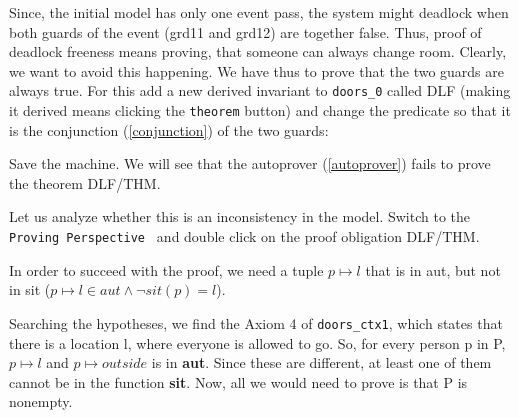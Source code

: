 Since, the initial model has only one event \textsf{pass}, the system might deadlock when both guards of the event (\textsf{grd11} and \textsf{grd12}) are together false. Thus, proof of deadlock freeness means proving, that someone can always change room. Clearly, we want to avoid this happening. We have thus to prove that the two guards are always true. For this add a new derived invariant to \texttt{doors\_0} called \textsf{DLF} (making it derived means clicking the \texttt{theorem} button) and change the predicate so that it is the conjunction (\ref{conjunction}) of the two guards:

\begin{description}
\INVARIANTS
	\begin{description}
	\end{description}
\end{description}


Save the machine. We will see that the autoprover (\ref{autoprover}) fails to prove the theorem \textsf{DLF/THM}.


Let us analyze whether this is an inconsistency in the model. Switch to the \texttt{Proving Perspective } and double click on the proof obligation \textsf{DLF/THM}.



In order to succeed with the proof, we need a tuple $p \mapsto l$ that is in \textsf{aut}, but not in \textsf{sit} ($p \mapsto l \in aut \wedge \lnot sit(p)=l$).

Searching the hypotheses, we find the Axiom 4 of \texttt{doors\_ctx1}, which states that there is a location \textsf{l}, where everyone is allowed to go. So, for every person \textsf{p} in \textsf{P}, $p \mapsto l$ and $p \mapsto outside$ is in \textbf{aut}. Since these are different, at least one of them cannot be in the function \textbf{sit}. Now, all we would need to prove is that \textsf{P} is nonempty. 

